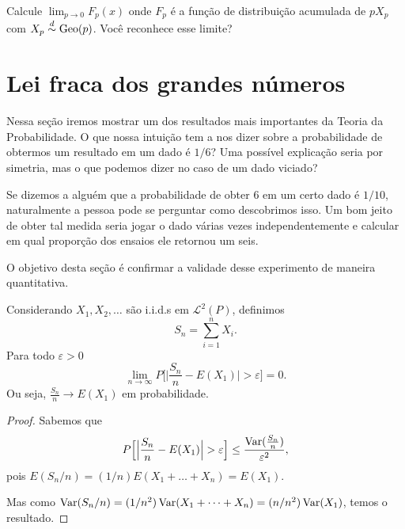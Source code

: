 \begin{exercise}
  Calcule $\lim_{p \to 0} F_p(x)$ onde $F_p$ é a função de distribuição acumulada de $p X_p$ com $X_p \overset{d}\sim \operatorname{Geo}(p)$.
  Você reconhece esse limite?
\end{exercise}

\section{Lei fraca dos grandes números}

Nessa seção iremos mostrar um dos resultados mais importantes da Teoria da Probabilidade.
O que nossa intuição tem a nos dizer sobre a probabilidade de obtermos um resultado em um dado é $1/6$?
Uma possível explicação seria por simetria, mas o que podemos dizer no caso de um dado viciado?

Se dizemos a alguém que a probabilidade de obter $6$ em um certo dado é $1/10$, naturalmente a pessoa pode se perguntar como descobrimos isso.
Um bom jeito de obter tal medida seria jogar o dado várias vezes independentemente e calcular em qual proporção dos ensaios ele retornou um seis.

O objetivo desta seção é confirmar a validade desse experimento de maneira quantitativa.

\begin{theorem}
  \label{t:lei_fraca}
  Considerando $X_1, X_2, \dots$ são i.i.d.s em $\mathcal{L}^2(P)$, definimos
  \begin{equation}
    S_n = \sum_{i=1}^n X_i.
  \end{equation}
  Para todo $\varepsilon > 0$
  \begin{equation}
    \lim_{n \to \infty} P \Big[\Big| \frac{S_n}{n} - E(X_1)\Big| > \varepsilon \Big] = 0.
  \end{equation}
  Ou seja, $\tfrac{S_n}{n} \to E(X_1)$ em probabilidade.
\end{theorem}



\begin{proof}
  Sabemos que
  \begin{equation}
    P \Big[\Big| \frac{S_n}{n} - E(X_1)\Big| > \varepsilon \Big] \leq \frac{\operatorname{Var}(\tfrac{S_n}{n})}{\varepsilon^2},
  \end{equation}
  pois $E(S_n/n) = (1/n) E(X_1 + \dots + X_n) = E(X_1)$.

  Mas como $\operatorname{Var}(S_n/n) = (1/n^2) \operatorname{Var} (X_1 + \dots + X_n) = (n/n^2) \operatorname{Var}(X_1)$, temos o resultado.
\end{proof}

